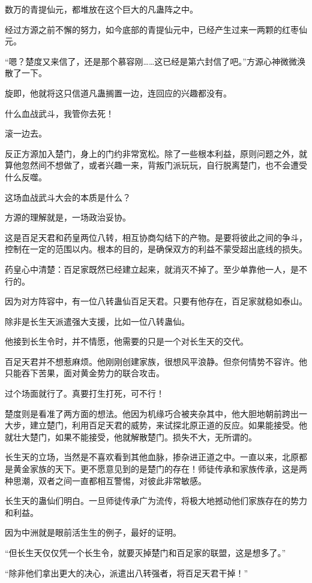 \begin{this_body}
数万的青提仙元，都堆放在这个巨大的凡蛊阵之中。

经过方源之前不懈的努力，如今底部的青提仙元中，已经产生过来一两颗的红枣仙元。

“嗯？楚度又来信了，还是那个慕容刚……这已经是第六封信了吧。”方源心神微微涣散了一下。

旋即，他就将这只信道凡蛊搁置一边，连回应的兴趣都没有。

什么血战武斗，我管你去死！

滚一边去。

反正方源加入楚门，身上的门约非常宽松。除了一些根本利益，原则问题之外，就算他忽然间不想做了，或者兴趣一来，背叛门派玩玩，自行脱离楚门，也不会遭受什么反噬。

这场血战武斗大会的本质是什么？

方源的理解就是，一场政治妥协。

这是百足天君和药皇两位八转，相互协商勾结下的产物。是要将彼此之间的争斗，控制在一定的范围以内。根本的目的，是确保双方的利益不蒙受超出底线的损失。

药皇心中清楚：百足家既然已经建立起来，就消灭不掉了。至少单靠他一人，是不行的。

因为对方阵容中，有一位八转蛊仙百足天君。只要有他存在，百足家就稳如泰山。

除非是长生天派遣强大支援，比如一位八转蛊仙。

他接到长生令时，并不情愿，他需要的只是一个对长生天的交代。

百足天君并不想惹麻烦。他刚刚创建家族，很想风平浪静。但奈何情势不容许。他只能吞下苦果，面对黄金势力的联合攻击。

过个场面就行了。真要打生打死，可不行！

楚度则是看准了两方面的想法。他因为机缘巧合被夹杂其中，他大胆地朝前跨出一大步，建立楚门，利用百足天君的威势，来试探北原正道的反应。如果能接受。他就壮大楚门，如果不能接受，他就解散楚门。损失不大，无所谓的。

长生天的立场，当然是不喜欢看到其他血脉，掺杂进正道之中。一直以来，北原都是黄金家族的天下。更不愿意见到的是楚门的存在！师徒传承和家族传承，这是两种思潮，双者之间一直都相互警惕，对彼此非常敏感。

长生天的蛊仙们明白。一旦师徒传承广为流传，将极大地撼动他们家族存在的势力和利益。

因为中洲就是眼前活生生的例子，最好的证明。

“但长生天仅仅凭一个长生令，就要灭掉楚门和百足家的联盟，这是想多了。”

“除非他们拿出更大的决心，派遣出八转强者，将百足天君干掉！”


\end{this_body}
